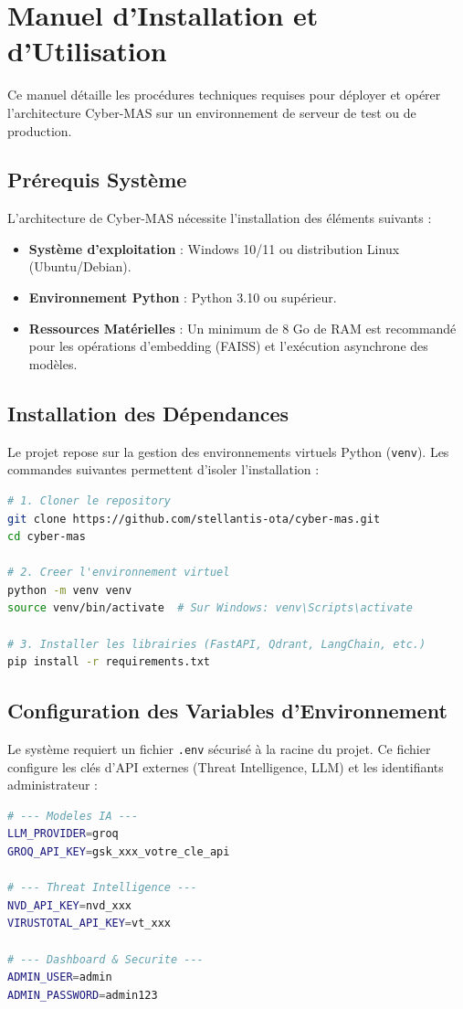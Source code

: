 \documentclass[a4paper, 12pt]{report}
\begin{document}
\chapter{Manuel d'Installation et d'Utilisation}
\label{annexe:manuel_utilisation}

Ce manuel détaille les procédures techniques requises pour déployer et opérer l'architecture Cyber-MAS sur un environnement de serveur de test ou de production.

\section{Prérequis Système}
L'architecture de Cyber-MAS nécessite l'installation des éléments suivants :
\begin{itemize}
    \item \textbf{Système d'exploitation} : Windows 10/11 ou distribution Linux (Ubuntu/Debian).
    \item \textbf{Environnement Python} : Python 3.10 ou supérieur.
    \item \textbf{Ressources Matérielles} : Un minimum de 8 Go de RAM est recommandé pour les opérations d'embedding (FAISS) et l'exécution asynchrone des modèles.
\end{itemize}

\section{Installation des Dépendances}
Le projet repose sur la gestion des environnements virtuels Python (\texttt{venv}). Les commandes suivantes permettent d'isoler l'installation :
\begin{lstlisting}[language=bash, basicstyle=\footnotesize\ttfamily\color{codeid}, caption={Commandes d\'installation et de préparation de l\'environnement virtuel.}]
# 1. Cloner le repository
git clone https://github.com/stellantis-ota/cyber-mas.git
cd cyber-mas

# 2. Creer l'environnement virtuel
python -m venv venv
source venv/bin/activate  # Sur Windows: venv\Scripts\activate

# 3. Installer les librairies (FastAPI, Qdrant, LangChain, etc.)
pip install -r requirements.txt
\end{lstlisting}

\section{Configuration des Variables d'Environnement}
Le système requiert un fichier \texttt{.env} sécurisé à la racine du projet. Ce fichier configure les clés d'API externes (Threat Intelligence, LLM) et les identifiants administrateur :
\begin{lstlisting}[language=bash, basicstyle=\footnotesize\ttfamily\color{codeid}, caption={Configuration des variables d\'environnement (.env).}]
# --- Modeles IA ---
LLM_PROVIDER=groq
GROQ_API_KEY=gsk_xxx_votre_cle_api

# --- Threat Intelligence ---
NVD_API_KEY=nvd_xxx
VIRUSTOTAL_API_KEY=vt_xxx

# --- Dashboard & Securite ---
ADMIN_USER=admin
ADMIN_PASSWORD=admin123
\end{lstlisting}
\end{document}
